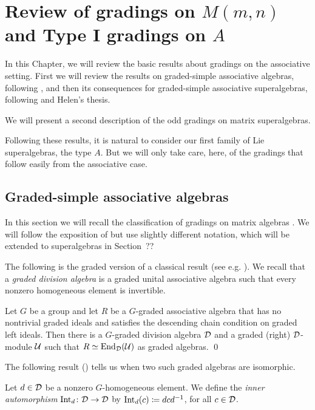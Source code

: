 \chapter{Review of gradings on $M(m,n)$ and Type I gradings on $A$}\label{chap:A-type-I}

In this Chapter, we will review the basic results about gradings on the associative setting. 
First we will review the results on graded-simple associative algebras, following \cite{BK10}, and then its consequences for graded-simple associative superalgebras, following \cite{paper-MAP} and Helen's thesis. 

We will present a second description of the odd gradings on matrix superalgebras.

Following these results, it is natural to consider our first family of Lie superalgebras, the type $A$. 
But we will only take care, here, of the gradings that follow easily from the associative case.


\section{Graded-simple associative algebras}


In this section we will recall the classification of gradings on matrix algebras \cite{BSZ01, BZ02, BK10}. We will follow the exposition of \cite[Chapter 2]{livromicha} but use slightly different notation, which will be extended to superalgebras in Section~??%

The following is the graded version of a classical result (see e.g. \cite[Theorem 2.6]{livromicha}). 
We recall that a \emph{graded division algebra} is a graded unital associative algebra such that every nonzero homogeneous element is invertible.

\begin{thm}\label{thm:End-over-D}
	Let $G$ be a group and let $R$ be a $G$-graded associative algebra that has no nontrivial graded ideals and satisfies the descending chain condition on 
	graded left ideals.
	Then there is a $G$-graded division algebra $\mathcal{D}$ and a graded (right) $\mathcal{D}$-module $\mathcal U$ such that $R \simeq \operatorname{End}_{\mathcal{D}} (\mathcal U)$ as graded algebras. \qed
\end{thm}

The following result (\cite[Theorem 2.10]{livromicha}) tells us when two such graded algebras are isomorphic.

\begin{defi}\label{def:inner-automorphism}
    Let $d\in \mathcal{D}$ be a nonzero $G$-homogeneous element. 
    We define the \emph{inner automorphism} $\operatorname{Int}_d\colon \mathcal{D} \to \mathcal{D}$ by $\operatorname{Int}_d (c) \coloneqq dcd^{-1}$, for all $c\in \mathcal{D}$.
\end{defi}

